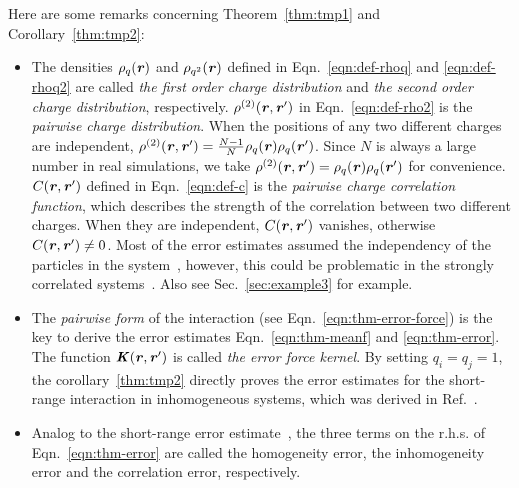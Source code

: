 \documentclass[aps,pre,preprint,unsortedaddress]{revtex4}
\renewcommand{\v}[1]{\textbf{\textit{#1}}}
\begin{document}
Here are some remarks concerning Theorem~\ref{thm:tmp1} and Corollary~\ref{thm:tmp2}:
\begin{itemize}
\item The densities $\rho_q(\v r)$ and $\rho_{q^2}(\v r)$ defined in
  Eqn.~\eqref{eqn:def-rhoq} and \eqref{eqn:def-rhoq2} are called \emph{the
    first order charge distribution} and \emph{the
    second order charge distribution},
  respectively.
  $\rho^{(2)}(\v r, \v r')$ in Eqn.~\eqref{eqn:def-rho2}
  is the \emph{pairwise charge distribution}.
  When the positions of any two different charges are independent,
  $\rho^{(2)}(\v r, \v r') = \frac{N-1}{N}\rho_q(\v r)\rho_q(\v r')$.
  Since $N$ is always a large number in real simulations, we take
  $\rho^{(2)}(\v r, \v r') = \rho_q(\v r)\rho_q(\v r')$ for convenience.
  $C(\v r, \v r')$ defined in
  Eqn.~\eqref{eqn:def-c} is the \emph{pairwise charge correlation function},
  which describes the strength of the correlation between  two
  different charges. When they are independent, $C(\v r, \v r')$
  vanishes, otherwise $C(\v r, \v r') \neq 0$.
  Most of the error estimates assumed the independency of the
  particles in the system~\cite{kolafa1992cutoff, hummer1995numerical, deserno1998mue2, petersen1995accuracy, wang2010optimizing, neelov2010interlaced, ballenegger2012convert, wang2012},
  however, this could be problematic in the strongly correlated
  systems~\cite{deserno1998mue2, wang2010optimizing}.
  Also see Sec.~\ref{sec:example3} for example.
\item
  The \emph{pairwise form}
  of the interaction (see Eqn.~\eqref{eqn:thm-error-force}) is the key to derive
  the error estimates Eqn.~\eqref{eqn:thm-meanf} and \eqref{eqn:thm-error}.
  The function $\v K(\v r, \v r')$ is called \emph{the error force
    kernel}.
  By setting $q_i = q_j = 1$, the corollary~\ref{thm:tmp2} directly proves
  the error estimates for the short-range interaction
  in inhomogeneous systems, which was derived in Ref.~\cite{wang2012}. 
\item Analog to the short-range error estimate~\cite{wang2012}, the
  three terms on the r.h.s. of Eqn.~\eqref{eqn:thm-error} are called the
  homogeneity error, the inhomogeneity error and the correlation
  error, respectively.

\end{itemize}
\end{document}
